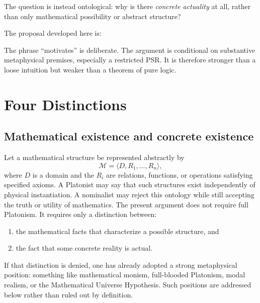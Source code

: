 \documentclass[11pt,letterpaper]{article}
\theoremstyle{plain}
\theoremstyle{definition}
\begin{document}
The question is instead ontological: why is there \emph{concrete actuality} at all, rather than only mathematical possibility or abstract structure?

The proposal developed here is:

\medskip
\noindent{}
\medskip

The phrase ``motivates'' is deliberate. The argument is conditional on substantive metaphysical premises, especially a restricted PSR. It is therefore stronger than a loose intuition but weaker than a theorem of pure logic.

\section{Four Distinctions}

\subsection{Mathematical existence and concrete existence}

Let a mathematical structure be represented abstractly by
\[
  \mathcal{M} = \langle D, R_1, \ldots, R_n \rangle,
\]
where $D$ is a domain and the $R_i$ are relations, functions, or operations satisfying specified axioms. A Platonist may say that such structures exist independently of physical instantiation. A nominalist may reject this ontology while still accepting the truth or utility of mathematics. The present argument does not require full Platonism. It requires only a distinction between:
\begin{enumerate}[label=(\roman*)]
  \item the mathematical facts that characterize a possible structure, and
  \item the fact that some concrete reality is actual.
\end{enumerate}
If that distinction is denied, one has already adopted a strong metaphysical position: something like mathematical monism, full-blooded Platonism, modal realism, or the Mathematical Universe Hypothesis. Such positions are addressed below rather than ruled out by definition.
\end{document}
